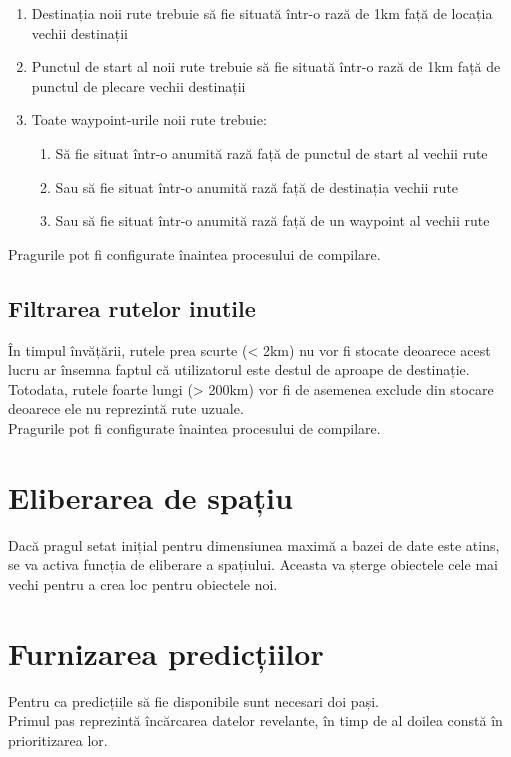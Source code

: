 		\begin{enumerate}
	 \setlength\itemsep{0em}
		\item Destinația noii rute trebuie să fie situată într-o rază de 1km față de locația vechii destinații
		\item Punctul de start al noii rute trebuie să fie situată într-o rază de 1km față de punctul de plecare vechii destinații
		\item Toate waypoint-urile noii rute trebuie:
				\begin{enumerate}
				 \setlength\itemsep{0em}
					\item Să fie situat într-o anumită rază față de punctul de start al vechii rute
					\item Sau să fie situat într-o anumită rază față de destinația vechii rute
					\item Sau să fie situat într-o anumită rază față de un waypoint al vechii rute
				\end{enumerate}
	\end{enumerate}

Pragurile pot fi configurate înaintea procesului de compilare.


	\subsection{Filtrarea rutelor inutile}
	În timpul învățării, rutele prea scurte (< 2km) nu vor fi stocate deoarece acest lucru ar însemna faptul că utilizatorul este destul de aproape de destinație.
	\vspace{6pt}
  \\Totodata, rutele foarte lungi (> 200km) vor fi de asemenea exclude din stocare deoarece ele nu reprezintă rute uzuale.
	\vspace{6pt}
  \\Pragurile pot fi configurate înaintea procesului de compilare.
	
\section{Eliberarea de spațiu} 
Dacă pragul setat inițial pentru dimensiunea maximă a bazei de date este atins, se va activa funcția de eliberare a spațiului. Aceasta va șterge obiectele cele mai vechi pentru a crea loc pentru obiectele noi.

\section{Furnizarea predicțiilor} 
Pentru ca predicțiile să fie disponibile sunt necesari doi pași.
\vspace{6pt}
\\Primul pas reprezintă încărcarea datelor revelante, în timp de al doilea constă în prioritizarea lor.

